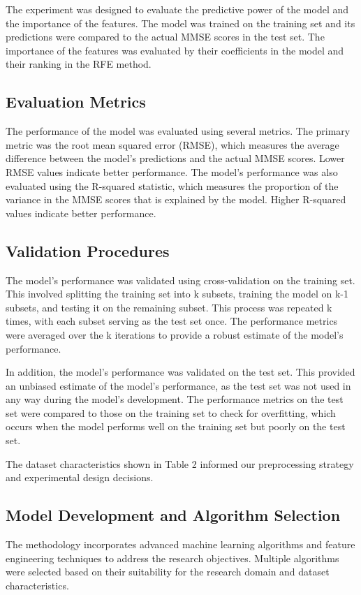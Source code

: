 \documentclass[conference]{IEEEtran}
\begin{document}
The experiment was designed to evaluate the predictive power of the model and the importance of the features. The model was trained on the training set and its predictions were compared to the actual MMSE scores in the test set. The importance of the features was evaluated by their coefficients in the model and their ranking in the RFE method.

\subsection{Evaluation Metrics}

The performance of the model was evaluated using several metrics. The primary metric was the root mean squared error (RMSE), which measures the average difference between the model's predictions and the actual MMSE scores. Lower RMSE values indicate better performance. The model's performance was also evaluated using the R-squared statistic, which measures the proportion of the variance in the MMSE scores that is explained by the model. Higher R-squared values indicate better performance.

\subsection{Validation Procedures}

The model's performance was validated using cross-validation on the training set. This involved splitting the training set into k subsets, training the model on k-1 subsets, and testing it on the remaining subset. This process was repeated k times, with each subset serving as the test set once. The performance metrics were averaged over the k iterations to provide a robust estimate of the model's performance.

In addition, the model's performance was validated on the test set. This provided an unbiased estimate of the model's performance, as the test set was not used in any way during the model's development. The performance metrics on the test set were compared to those on the training set to check for overfitting, which occurs when the model performs well on the training set but poorly on the test set.

The dataset characteristics shown in Table 2 informed our preprocessing strategy and experimental design decisions.

\subsection{Model Development and Algorithm Selection}
The methodology incorporates advanced machine learning algorithms and feature engineering techniques to address the research objectives. Multiple algorithms were selected based on their suitability for the research domain and dataset characteristics.
\end{document}
